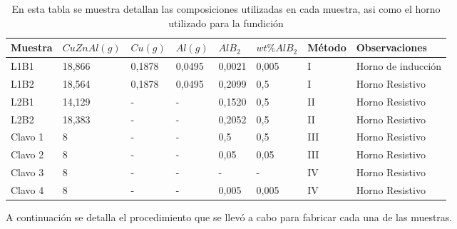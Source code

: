 \documentclass[a4paper,12pt,fleqn,twoside,openany]{book}
\begin{document}
\begin{table} %
\begin{center}
\begin{tabular}{@{}llllllll@{}}  \toprule
Muestra & $CuZnAl (g)$ & $Cu (g)$ & $Al (g)$ & $AlB_2$ & $wt \% AlB_2$ & Método & Observaciones \\ \midrule
L1B1 & 18,866  & 0,1878 & 0,0495 & 0,0021 & 0,005 & I & Horno de inducción\\
L1B2 & 18,564  & 0,1878 & 0,0495 & 0,2099 & 0,5 & I &Horno Resistivo\\
L2B1 & 14,129  & - & -  & 0,1520 & 0,5 & II &Horno Resistivo \\
L2B2 & 18,383 & - & -  & 0,2052 & 0,5 &II & Horno Resistivo \\
Clavo 1 & 8 & - & - & 0,5 & 0,5 & III & Horno Resistivo \\
Clavo 2 & 8 & - & - & 0,05 & 0,05 &III & Horno Resistivo \\
Clavo 3 & 8 & - & - & - & - &  IV & Horno Resistivo \\
Clavo 4 & 8 & - & - & 0,005 & 0,005 &IV & Horno Resistivo \\
\bottomrule
\end{tabular}
\caption{En esta tabla se muestra detallan las composiciones utilizadas en cada muestra, asi como el horno utilizado para la fundición}
\label{tab:FabMuestras}
\end{center}
\end{table}

A continuación se detalla el procedimiento que se llevó a cabo para fabricar cada una de las muestras.
\end{document}
